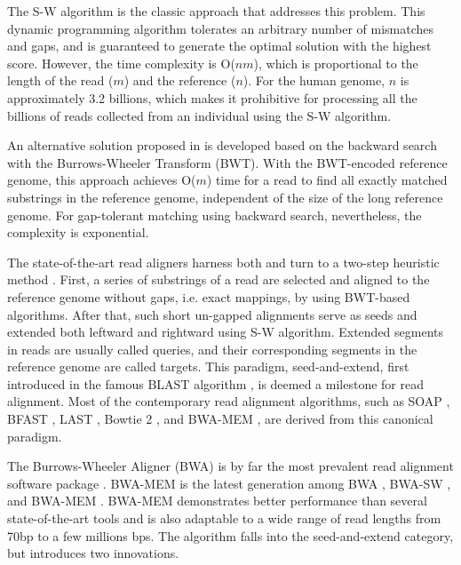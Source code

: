 The S-W algorithm \cite{Smith1981} is the classic approach that addresses this problem. 
This dynamic programming algorithm tolerates an arbitrary number of mismatches and gaps, 
and is guaranteed to generate the optimal solution with the highest score. 
However, the time complexity is O($nm$), which is proportional to the length of the read ($m$) and the reference ($n$). 
For the human genome, $n$ is approximately 3.2 billions, 
which makes it prohibitive for processing all the billions of reads collected from an individual using the S-W algorithm.

An alternative solution proposed in \cite{BWA} is developed based on the backward search with the Burrows-Wheeler Transform (BWT).
With the BWT-encoded reference genome, this approach achieves O($m$) time for a read to find all exactly matched substrings in the reference genome, 
independent of the size of the long reference genome. For gap-tolerant matching using backward search, 
nevertheless, the complexity is exponential.

The state-of-the-art read aligners harness both and turn to a two-step heuristic method \cite{Heng2010}. 
First, a series of substrings of a read are selected and aligned to the reference genome without gaps, i.e. exact mappings, by using BWT-based algorithms.
After that, such short un-gapped alignments serve as seeds and extended both leftward and rightward using S-W algorithm. 
Extended segments in reads are usually called queries, and their corresponding segments in the reference genome are called targets. 
This paradigm, seed-and-extend, first introduced in the famous BLAST algorithm \cite{BLAST1990}, is deemed a milestone for read alignment.
Most of the contemporary read alignment algorithms, such as SOAP \cite{SOAP}, BFAST \cite{BFAST}, LAST \cite{LAST}, Bowtie 2 \cite{Bowtie2}, and BWA-MEM \cite{BWA-MEM}, 
are derived from this canonical paradigm.

The Burrows-Wheeler Aligner (BWA) is by far the most prevalent read alignment software package \cite{BWA}\cite{BWA-SW}\cite{BWA-MEM}.
BWA-MEM \cite{BWA-MEM} is the latest generation among BWA \cite{BWA}, BWA-SW \cite{BWA-SW}, and BWA-MEM \cite{BWA-MEM}. 
BWA-MEM demonstrates better performance than several state-of-the-art tools 
and is also adaptable to a wide range of read lengths from 70bp to a few millions bps. 
The algorithm falls into the seed-and-extend category, but introduces two innovations.


